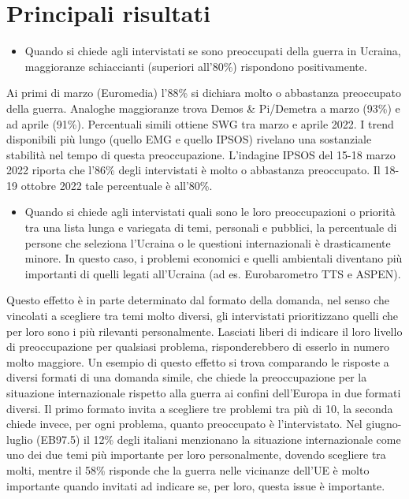 \documentclass[
]{book}
\providecommand{\tightlist}{%
  \setlength{\itemsep}{0pt}\setlength{\parskip}{0pt}}
\begin{document}
\hypertarget{principali-risultati}{%
\section{Principali risultati}\label{principali-risultati}}

\begin{itemize}
\tightlist
\item
  Quando si chiede agli intervistati se sono preoccupati della guerra in Ucraina, maggioranze schiaccianti (superiori all'80\%) rispondono positivamente.
\end{itemize}

Ai primi di marzo (Euromedia) l'88\% si dichiara molto o abbastanza preoccupato della guerra. Analoghe maggioranze trova Demos \& Pi/Demetra a marzo (93\%) e ad aprile (91\%). Percentuali simili ottiene SWG tra marzo e aprile 2022. I trend disponibili più lungo (quello EMG e quello IPSOS) rivelano una sostanziale stabilità nel tempo di questa preoccupazione. L'indagine IPSOS del 15-18 marzo 2022 riporta che l'86\% degli intervistati è molto o abbastanza preoccupato. Il 18-19 ottobre 2022 tale percentuale è all'80\%.

\begin{itemize}
\tightlist
\item
  Quando si chiede agli intervistati quali sono le loro preoccupazioni o priorità tra una lista lunga e variegata di temi, personali e pubblici, la percentuale di persone che seleziona l'Ucraina o le questioni internazionali è drasticamente minore. In questo caso, i problemi economici e quelli ambientali diventano più importanti di quelli legati all'Ucraina (ad es. Eurobarometro TTS e ASPEN).
\end{itemize}

Questo effetto è in parte determinato dal formato della domanda, nel senso che vincolati a scegliere tra temi molto diversi, gli intervistati prioritizzano quelli che per loro sono i più rilevanti personalmente. Lasciati liberi di indicare il loro livello di preoccupazione per qualsiasi problema, risponderebbero di esserlo in numero molto maggiore. Un esempio di questo effetto si trova comparando le risposte a diversi formati di una domanda simile, che chiede la preoccupazione per la situazione internazionale rispetto alla guerra ai confini dell'Europa in due formati diversi. Il primo formato invita a scegliere tre problemi tra più di 10, la seconda chiede invece, per ogni problema, quanto preoccupato è l'intervistato. Nel giugno-luglio (EB97.5) il 12\% degli italiani menzionano la situazione internazionale come uno dei due temi più importante per loro personalmente, dovendo scegliere tra molti, mentre il 58\% risponde che la guerra nelle vicinanze dell'UE è molto importante quando invitati ad indicare se, per loro, questa issue è importante.
\end{document}
